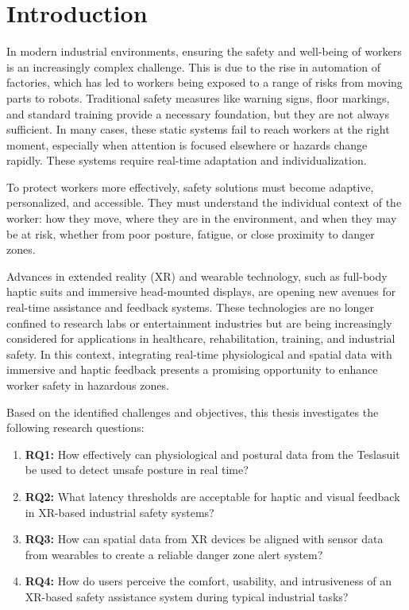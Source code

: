 \chapter{Introduction}
In modern industrial environments, ensuring the safety and well-being of workers is an increasingly complex challenge. This is due to the rise in automation of factories, which has led to workers being exposed to a range of risks from moving parts to robots. Traditional safety measures like warning signs, floor markings, and standard training provide a necessary foundation, but they are not always sufficient. In many cases, these static systems fail to reach workers at the right moment, especially when attention is focused elsewhere or hazards change rapidly. These systems require real-time adaptation and individualization.

To protect workers more effectively, safety solutions must become adaptive, personalized, and accessible. They must understand the individual context of the worker: how they move, where they are in the environment, and when they may be at risk, whether from poor posture, fatigue, or close proximity to danger zones.

Advances in extended reality (XR) and wearable technology, such as full-body haptic suits and immersive head-mounted displays, are opening new avenues for real-time assistance and feedback systems. These technologies are no longer confined to research labs or entertainment industries but are being increasingly considered for applications in healthcare, rehabilitation, training, and industrial safety. In this context, integrating real-time physiological and spatial data with immersive and haptic feedback presents a promising opportunity to enhance worker safety in hazardous zones. 

Based on the identified challenges and objectives, this thesis investigates the following research questions:

\begin{enumerate}
  \item \textbf{RQ1:} How effectively can physiological and postural data from the Teslasuit be used to detect unsafe posture in real time?
  \item \textbf{RQ2:} What latency thresholds are acceptable for haptic and visual feedback in XR-based industrial safety systems?
  \item \textbf{RQ3:} How can spatial data from XR devices be aligned with sensor data from wearables to create a reliable danger zone alert system?
  \item \textbf{RQ4:} How do users perceive the comfort, usability, and intrusiveness of an XR-based safety assistance system during typical industrial tasks?
\end{enumerate}

